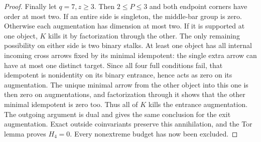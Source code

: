 \begin{proof}
Finally let $q=7,z\ge3$. Then $2\le P\le3$ and both endpoint
corners have order at most two. If an entire side is singleton,
the middle-bar group is zero. Otherwise each augmentation has
dimension at most two. If it is supported at one object, $K$
kills it by factorization through the other. The only remaining
possibility on either side is two binary stalks. At least one
object has all internal incoming cross arrows fixed by its
minimal idempotent: the single extra arrow can have at most one
distinct target. Since all four full conditions fail, that
idempotent is nonidentity on its binary entrance, hence acts
as zero on its augmentation. The unique minimal arrow from the
other object into this one is then zero on augmentations, and
factorization through it shows that the other minimal idempotent
is zero too. Thus all of $K$ kills the entrance augmentation.
The outgoing argument is dual and gives the same conclusion for
the exit augmentation. Exact outside coinvariants preserve this
annihilation, and the Tor lemma proves $H_4=0$. Every nonextreme
budget has now been excluded.
\end{proof}
